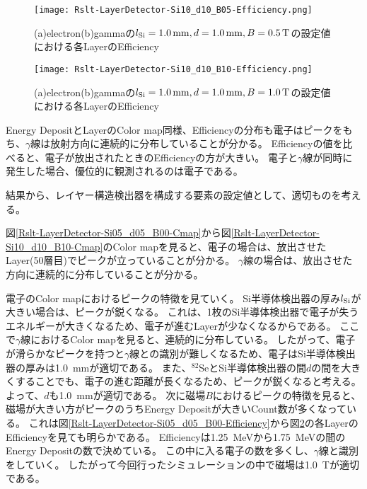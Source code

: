 \documentclass[a4paper,10pt]{jreport}
\begin{document}
\begin{figure}[H]
	\center
	\texttt{[image: Rslt-LayerDetector-Si10\_d10\_B05-Efficiency.png]}
	\caption{(a)electron(b)gammaの$l_{\rm{Si}}=\SI{1.0}{mm}, d=\SI{1.0}{mm}, B=\SI{0.5}{T}$の設定値における各LayerのEfficiency}
	\label{Rslt-LayerDetector-Si10_d10_B05-Efficiency}
\end{figure}

\begin{figure}[H]
	\center
	\texttt{[image: Rslt-LayerDetector-Si10\_d10\_B10-Efficiency.png]}
	\caption{(a)electron(b)gammaの$l_{\rm{Si}}=\SI{1.0}{mm}, d=\SI{1.0}{mm}, B=\SI{1.0}{T}$の設定値における各LayerのEfficiency}
	\label{Rslt-LayerDetector-Si10_d10_B10-Efficiency}
\end{figure}

Energy DepositとLayerのColor map同様、Efficiencyの分布も電子はピークをもち、$\gamma$線は放射方向に連続的に分布していることが分かる。
Efficiencyの値を比べると、電子が放出されたときのEfficiencyの方が大きい。
電子と$\gamma$線が同時に発生した場合、優位的に観測されるのは電子である。

結果から、レイヤー構造検出器を構成する要素の設定値として、適切ものを考える。

図\ref{Rslt-LayerDetector-Si05_d05_B00-Cmap}から図\ref{Rslt-LayerDetector-Si10_d10_B10-Cmap}のColor mapを見ると、電子の場合は、放出させたLayer(50層目)でピークが立っていることが分かる。
$\gamma$線の場合は、放出させた方向に連続的に分布していることが分かる。

電子のColor mapにおけるピークの特徴を見ていく。
Si半導体検出器の厚み$l_{\rm{Si}}$が大きい場合は、ピークが鋭くなる。
これは、1枚のSi半導体検出器で電子が失うエネルギーが大きくなるため、電子が進むLayerが少なくなるからである。
ここで$\gamma$線におけるColor mapを見ると、連続的に分布している。
したがって、電子が滑らかなピークを持つと$\gamma$線との識別が難しくなるため、電子はSi半導体検出器の厚みは\SI{1.0}{mm}が適切である。
また、$^{82}$SeとSi半導体検出器の間$d$の間を大きくすることでも、電子の進む距離が長くなるため、ピークが鋭くなると考える。
よって、$d$も\SI{1.0}{mm}が適切である。
次に磁場$B$におけるピークの特徴を見ると、磁場が大きい方がピークのうちEnergy Depositが大きいCount数が多くなっている。
これは図\ref{Rslt-LayerDetector-Si05_d05_B00-Efficiency}から図\ref{Rslt-LayerDetector-Si10_d10_B10-Efficiency}の各LayerのEfficiencyを見ても明らかである。
Efficiencyは\SI{1.25}{MeV}から\SI{1.75}{MeV}の間のEnergy Depositの数で決めている。
この中に入る電子の数を多くし、$\gamma$線と識別をしていく。
したがって今回行ったシミュレーションの中で磁場は\SI{1.0}{T}が適切である。
\end{document}
